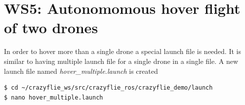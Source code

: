 \section{WS5: Autonomomous hover flight of two drones}
\label{section:ws5}

In order to hover more than a single drone a special launch file is needed. It is similar to having multiple launch file for a single drone in a single file. A new launch file named \textit{hover\_multiple.launch} is created 
\begin{mdframed}[backgroundcolor=light-gray, linecolor=light-gray]
\begin{verbatim}
$ cd ~/crazyflie_ws/src/crazyflie_ros/crazyflie_demo/launch
$ nano hover_multiple.launch
\end{verbatim}
\end{mdframed}

